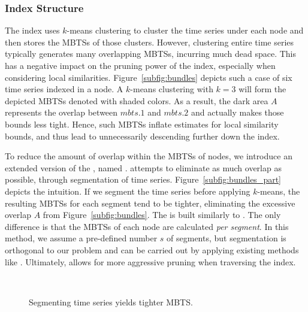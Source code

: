 \subsubsection{Index Structure}
\label{subsec:structure_sbtsr}
The \btsr index uses $k$-means clustering to cluster the time series under each node and then stores the MBTSs of those clusters. However, clustering entire time series typically generates many overlapping MBTSs, incurring much dead space. This has a negative impact on the pruning power of the index, especially when considering local similarities. Figure~\ref{subfig:bundles} depicts such a case of six time series indexed in a node. A $k$-means clustering with $k=3$ will form the depicted MBTSs denoted with shaded colors. As a result, the dark area $A$ represents the overlap between $mbts.1$ and $mbts.2$ and actually makes those bounds less tight. Hence, such MBTSs inflate estimates for local similarity bounds, and thus lead to unnecessarily descending further down the index.

To reduce the amount of overlap within the MBTSs of nodes, we introduce an extended version of the \btsr, named \sbtsr. \sbtsr attempts to eliminate as much overlap as possible, through segmentation of time series. Figure~\ref{subfig:bundles_part} depicts the intuition. If we segment the time series before applying $k$-means, the resulting MBTSs for each segment tend to be tighter, eliminating the excessive overlap $A$ from Figure~\ref{subfig:bundles}. The \sbtsr is built similarly to \btsr. The only difference is that the MBTSs of each node are calculated \textit{per segment}. In this method, we assume a pre-defined number $s$ of segments, but segmentation is orthogonal to our problem and can be carried out by applying existing methods like \cite{bingham2006segmentation}. Ultimately, \sbtsr allows for more aggressive pruning when traversing the index.

\begin{figure}[!tb]
 \centering
  \\
 \vspace{-10pt} 
 \caption{Segmenting time series yields tighter MBTS.}
 \label{fig:proof_partition}
\end{figure}

